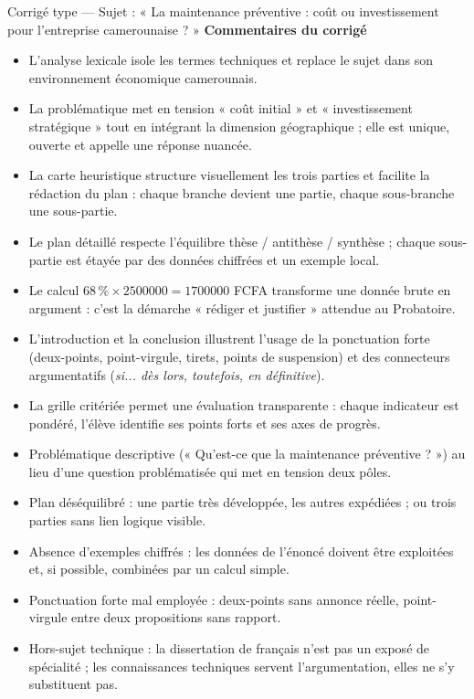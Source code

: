\documentclass[11pt]{article}
\begin{document}
\begin{exoresolu}{Corrigé type — Sujet : « La maintenance préventive : coût ou investissement pour l'entreprise camerounaise ? »}
\tcblower
\textbf{Commentaires du corrigé}
\begin{itemize}
    \item L'analyse lexicale isole les termes techniques et replace le sujet dans son environnement économique camerounais.
    \item La problématique met en tension « coût initial » et « investissement stratégique » tout en intégrant la dimension géographique ; elle est unique, ouverte et appelle une réponse nuancée.
    \item La carte heuristique structure visuellement les trois parties et facilite la rédaction du plan : chaque branche devient une partie, chaque sous-branche une sous-partie.
    \item Le plan détaillé respecte l'équilibre thèse / antithèse / synthèse ; chaque sous-partie est étayée par des données chiffrées et un exemple local.
    \item Le calcul $68\,\% \times \num{2500000} = \num{1700000}$ FCFA transforme une donnée brute en argument : c'est la démarche « rédiger et justifier » attendue au Probatoire.
    \item L'introduction et la conclusion illustrent l'usage de la ponctuation forte (deux-points, point-virgule, tirets, points de suspension) et des connecteurs argumentatifs (\emph{si... dès lors, toutefois, en définitive}).
    \item La grille critériée permet une évaluation transparente : chaque indicateur est pondéré, l'élève identifie ses points forts et ses axes de progrès.
\end{itemize}
\end{exoresolu}

\begin{attention}
\begin{itemize}
    \item Problématique descriptive (« Qu'est-ce que la maintenance préventive ? ») au lieu d'une question problématisée qui met en tension deux pôles.
    \item Plan déséquilibré : une partie très développée, les autres expédiées ; ou trois parties sans lien logique visible.
    \item Absence d'exemples chiffrés : les données de l'énoncé doivent être exploitées et, si possible, combinées par un calcul simple.
    \item Ponctuation forte mal employée : deux-points sans annonce réelle, point-virgule entre deux propositions sans rapport.
    \item Hors-sujet technique : la dissertation de français n'est pas un exposé de spécialité ; les connaissances techniques servent l'argumentation, elles ne s'y substituent pas.
\end{itemize}
\end{attention}
\end{document}
